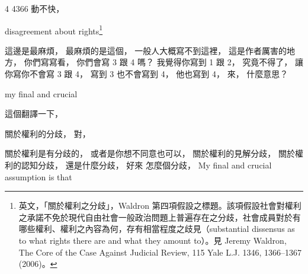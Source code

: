 \hypertarget{w06:cue:1803}{}4
\hypertarget{w06:cue:1804}{}4366
\hypertarget{w06:cue:1805}{}動不快，

\hypertarget{w06:cue:1806}{}disagreement about rights\footnote{英文，「關於權利之分歧」，Waldron 第四項假設之標題。該項假設社會對權利之承諾不免於現代自由社會一般政治問題上普遍存在之分歧，社會成員對於有哪些權利、權利之內容為何，存有相當程度之歧見（substantial dissensus as to what rights there are and what they amount to）。見 Jeremy Waldron, The Core of the Case Against Judicial Review, 115 Yale L.J. 1346, 1366–1367 (2006)。}

\hypertarget{w06:cue:1807}{}這邊是最麻煩，
\hypertarget{w06:cue:1808}{}最麻煩的是這個，
\hypertarget{w06:cue:1809}{}一般人大概寫不到這裡，
\hypertarget{w06:cue:1810}{}這是作者厲害的地方，
\hypertarget{w06:cue:1811}{}你們寫寫看，
\hypertarget{w06:cue:1812}{}你們會寫 3 跟 4 嗎？
\hypertarget{w06:cue:1813}{}我覺得你寫到 1 跟 2，
\hypertarget{w06:cue:1814}{}究竟不得了，
\hypertarget{w06:cue:1815}{}讓你寫你不會寫 3 跟 4，
\hypertarget{w06:cue:1816}{}寫到 3 也不會寫到 4，
\hypertarget{w06:cue:1817}{}他也寫到 4，
\hypertarget{w06:cue:1818}{}來，
\hypertarget{w06:cue:1819}{}什麼意思？

\hypertarget{w06:cue:1820}{}my final and crucial

\hypertarget{w06:cue:1821}{}這個翻譯一下，

\hypertarget{w06:cue:1822}{}關於權利的分歧，
\hypertarget{w06:cue:1823}{}對，

\hypertarget{w06:cue:1824}{}關於權利是有分歧的，
\hypertarget{w06:cue:1825}{}或者是你想不同意也可以，
\hypertarget{w06:cue:1826}{}關於權利的見解分歧，
\hypertarget{w06:cue:1827}{}關於權利的認知分歧，
\hypertarget{w06:cue:1828}{}還是什麼分歧，
\hypertarget{w06:cue:1829}{}好來 怎麼個分歧，
\hypertarget{w06:cue:1830}{}My final and crucial assumption
\hypertarget{w06:cue:1831}{}is that

